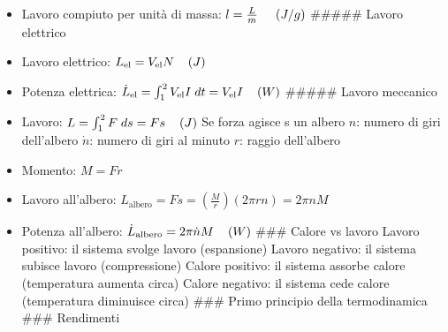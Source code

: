\begin{itemize}
  \(Q=\dot Q\Delta t\hspace{0.5cm}(J)\) In un sistema adiabatico \(Q=0\)
  \#\#\# Lavoro Il lavoro è la forma di energia che si trasferisce per
  l'effetto combinato di una forza e di uno spostamento.
\item
  Lavoro compiuto per unità di massa:
  \(l=\frac{L}{m}\hspace{0.5cm}(J/g)\) \#\#\#\#\# Lavoro elettrico
\item
  Lavoro elettrico: \(L_\text{el}=V_\text{el}N\hspace{0.4cm}(J)\)
\item
  Potenza elettrica:
  \(\dot L_\text{el}=\int_1^2V_\text{el}I\;dt=V_\text{el}I\hspace{0.4cm}(W)\)
  \#\#\#\#\# Lavoro meccanico
\item
  Lavoro: \(L=\int_1^2F\;ds=Fs\hspace{0.4cm}(J)\) Se forza agisce s un
  albero \(n\): numero di giri dell'albero \(\dot n\): numero di giri al
  minuto \(r\): raggio dell'albero
\item
  Momento: \(M=Fr\)
\item
  Lavoro all'albero:
  \(L_\text{albero}=Fs=\left(\frac{M}{r}\right)(2\pi rn)=2\pi nM\)
\item
  Potenza all'albero:
  \(\dot L_\text{albero}=2\pi\dot nM \hspace{0.4cm}(W)\) \#\#\# Calore
  vs lavoro Lavoro positivo: il sistema svolge lavoro (espansione)
  Lavoro negativo: il sistema subisce lavoro (compressione) Calore
  positivo: il sistema assorbe calore (temperatura aumenta circa) Calore
  negativo: il sistema cede calore (temperatura diminuisce circa) \#\#\#
  Primo principio della termodinamica \#\#\# Rendimenti
\end{itemize}
